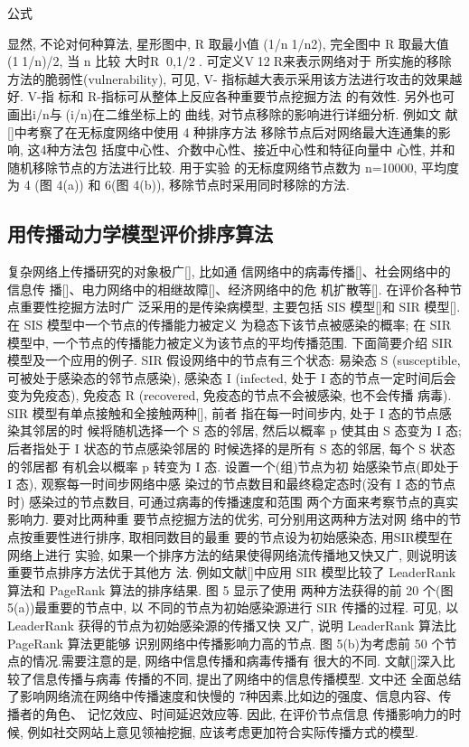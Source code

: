			公式

			显然, 不论对何种算法, 星形图中, R 取最小值 (1/n1/n2), 完全图中 R 取最大值(11/n)/2, 当 n 比较 大时R0,1/2. 可定义V12R来表示网络对于 所实施的移除方法的脆弱性(vulnerability), 可见, V- 指标越大表示采用该方法进行攻击的效果越好. V-指 标和 R-指标可从整体上反应各种重要节点挖掘方法 的有效性. 另外也可画出i/n与(i/n)在二维坐标上的 曲线, 对节点移除的影响进行详细分析. 例如文 献[]中考察了在无标度网络中使用 4 种排序方法 移除节点后对网络最大连通集的影响, 这4种方法包 括度中心性、介数中心性、接近中心性和特征向量中 心性, 并和随机移除节点的方法进行比较. 用于实验 的无标度网络节点数为 n=10000, 平均度为 4 (图 4(a)) 和 6(图 4(b)), 移除节点时采用同时移除的方法.
\subsection{用传播动力学模型评价排序算法}
复杂网络上传播研究的对象极广[], 比如通 信网络中的病毒传播[]、社会网络中的信息传 播[]、电力网络中的相继故障[]、经济网络中的危 机扩散等[]. 在评价各种节点重要性挖掘方法时广 泛采用的是传染病模型, 主要包括 SIS 模型[]和 SIR 模型[]. 在 SIS 模型中一个节点的传播能力被定义 为稳态下该节点被感染的概率; 在 SIR 模型中, 一个节点的传播能力被定义为该节点的平均传播范围.
			下面简要介绍 SIR 模型及一个应用的例子. SIR 假设网络中的节点有三个状态: 易染态 S (susceptible, 可被处于感染态的邻节点感染), 感染态 I (infected, 处于 I 态的节点一定时间后会变为免疫态), 免疫态 R (recovered, 免疫态的节点不会被感染, 也不会传播 病毒). SIR 模型有单点接触和全接触两种[], 前者 指在每一时间步内, 处于 I 态的节点感染其邻居的时 候将随机选择一个 S 态的邻居, 然后以概率 p 使其由 S 态变为 I 态; 后者指处于 I 状态的节点感染邻居的 时候选择的是所有 S 态的邻居, 每个 S 状态的邻居都 有机会以概率 p 转变为 I 态. 设置一个(组)节点为初 始感染节点(即处于 I 态), 观察每一时间步网络中感 染过的节点数目和最终稳定态时(没有 I 态的节点时) 感染过的节点数目, 可通过病毒的传播速度和范围 两个方面来考察节点的真实影响力. 要对比两种重 要节点挖掘方法的优劣, 可分别用这两种方法对网 络中的节点按重要性进行排序, 取相同数目的最重 要的节点设为初始感染态, 用SIR模型在网络上进行 实验, 如果一个排序方法的结果使得网络流传播地又快又广, 则说明该重要节点排序方法优于其他方 法. 例如文献[]中应用 SIR 模型比较了 LeaderRank 算法和 PageRank 算法的排序结果. 图 5 显示了使用 两种方法获得的前 20 个(图 5(a))最重要的节点中, 以 不同的节点为初始感染源进行 SIR 传播的过程. 可见, 以 LeaderRank 获得的节点为初始感染源的传播又快 又广, 说明 LeaderRank 算法比 PageRank 算法更能够 识别网络中传播影响力高的节点. 图 5(b)为考虑前 50 个节点的情况.需要注意的是, 网络中信息传播和病毒传播有 很大的不同. 文献[]深入比较了信息传播与病毒 传播的不同, 提出了网络中的信息传播模型. 文中还 全面总结了影响网络流在网络中传播速度和快慢的 7种因素,比如边的强度、信息内容、传播者的角色、 记忆效应、时间延迟效应等. 因此, 在评价节点信息 传播影响力的时候, 例如社交网站上意见领袖挖掘, 应该考虑更加符合实际传播方式的模型.
		